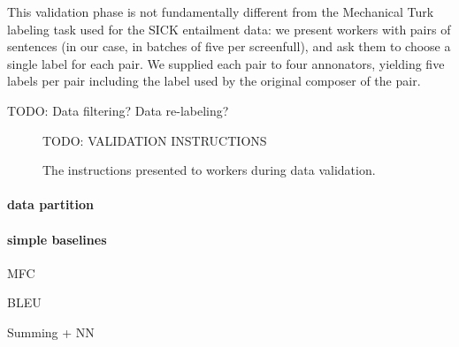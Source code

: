 This validation phase is not fundamentally different from the Mechanical Turk labeling task used for the SICK entailment data: we present workers with pairs of sentences (in our case, in batches of five per screenfull), and ask them to choose a single label for each pair. We supplied each pair to four annonators, yielding five labels per pair including the label used by the original composer of the pair. 

TODO: Data filtering? Data re-labeling?

\begin{figure}
\footnotesize
TODO: VALIDATION INSTRUCTIONS

\caption{\label{instructions-2}The instructions presented to workers during data validation.}
\end{figure}

\paragraph{data partition}

\paragraph{simple baselines}

MFC

BLEU

Summing + NN
